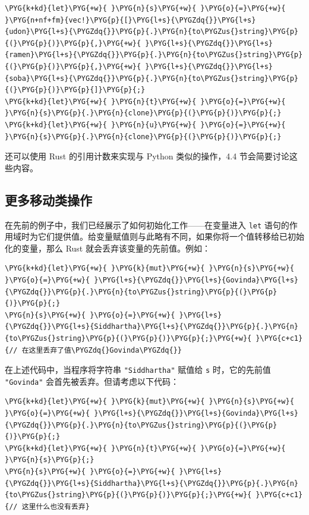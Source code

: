 \begin{Verbatim}[commandchars=\\\{\},breaklines=true,breakanywhere=true,fontsize=\codefont,xleftmargin=17bp]
\PYG{k+kd}{let}\PYG{+w}{ }\PYG{n}{s}\PYG{+w}{ }\PYG{o}{=}\PYG{+w}{ }\PYG{n+nf+fm}{vec!}\PYG{p}{[}\PYG{l+s}{\PYGZdq{}}\PYG{l+s}{udon}\PYG{l+s}{\PYGZdq{}}\PYG{p}{.}\PYG{n}{to\PYGZus{}string}\PYG{p}{(}\PYG{p}{)}\PYG{p}{,}\PYG{+w}{ }\PYG{l+s}{\PYGZdq{}}\PYG{l+s}{ramen}\PYG{l+s}{\PYGZdq{}}\PYG{p}{.}\PYG{n}{to\PYGZus{}string}\PYG{p}{(}\PYG{p}{)}\PYG{p}{,}\PYG{+w}{ }\PYG{l+s}{\PYGZdq{}}\PYG{l+s}{soba}\PYG{l+s}{\PYGZdq{}}\PYG{p}{.}\PYG{n}{to\PYGZus{}string}\PYG{p}{(}\PYG{p}{)}\PYG{p}{]}\PYG{p}{;}
\PYG{k+kd}{let}\PYG{+w}{ }\PYG{n}{t}\PYG{+w}{ }\PYG{o}{=}\PYG{+w}{ }\PYG{n}{s}\PYG{p}{.}\PYG{n}{clone}\PYG{p}{(}\PYG{p}{)}\PYG{p}{;}
\PYG{k+kd}{let}\PYG{+w}{ }\PYG{n}{u}\PYG{+w}{ }\PYG{o}{=}\PYG{+w}{ }\PYG{n}{s}\PYG{p}{.}\PYG{n}{clone}\PYG{p}{(}\PYG{p}{)}\PYG{p}{;}
\end{Verbatim}

还可以使用 Rust 的引用计数来实现与 Python 类似的操作，4.4 节会简要讨论这些内容。

\subsection{更多移动类操作}

在先前的例子中，我们已经展示了如何初始化工作——在变量进入 \texttt{let} 语句的作用域时为它们提供值。给变量赋值则与此略有不同，如果你将一个值转移给已初始化的变量，那么 Rust 就会丢弃该变量的先前值。例如：

\begin{Verbatim}[commandchars=\\\{\},breaklines=true,breakanywhere=true,fontsize=\codefont,xleftmargin=17bp]
\PYG{k+kd}{let}\PYG{+w}{ }\PYG{k}{mut}\PYG{+w}{ }\PYG{n}{s}\PYG{+w}{ }\PYG{o}{=}\PYG{+w}{ }\PYG{l+s}{\PYGZdq{}}\PYG{l+s}{Govinda}\PYG{l+s}{\PYGZdq{}}\PYG{p}{.}\PYG{n}{to\PYGZus{}string}\PYG{p}{(}\PYG{p}{)}\PYG{p}{;}
\PYG{n}{s}\PYG{+w}{ }\PYG{o}{=}\PYG{+w}{ }\PYG{l+s}{\PYGZdq{}}\PYG{l+s}{Siddhartha}\PYG{l+s}{\PYGZdq{}}\PYG{p}{.}\PYG{n}{to\PYGZus{}string}\PYG{p}{(}\PYG{p}{)}\PYG{p}{;}\PYG{+w}{ }\PYG{c+c1}{// 在这里丢弃了值\PYGZdq{}Govinda\PYGZdq{}}
\end{Verbatim}

在上述代码中，当程序将字符串 \texttt{"Siddhartha"} 赋值给 \texttt{s} 时，它的先前值 \texttt{"Govinda"} 会首先被丢弃。但请考虑以下代码：

\begin{Verbatim}[commandchars=\\\{\},breaklines=true,breakanywhere=true,fontsize=\codefont,xleftmargin=17bp]
\PYG{k+kd}{let}\PYG{+w}{ }\PYG{k}{mut}\PYG{+w}{ }\PYG{n}{s}\PYG{+w}{ }\PYG{o}{=}\PYG{+w}{ }\PYG{l+s}{\PYGZdq{}}\PYG{l+s}{Govinda}\PYG{l+s}{\PYGZdq{}}\PYG{p}{.}\PYG{n}{to\PYGZus{}string}\PYG{p}{(}\PYG{p}{)}\PYG{p}{;}
\PYG{k+kd}{let}\PYG{+w}{ }\PYG{n}{t}\PYG{+w}{ }\PYG{o}{=}\PYG{+w}{ }\PYG{n}{s}\PYG{p}{;}
\PYG{n}{s}\PYG{+w}{ }\PYG{o}{=}\PYG{+w}{ }\PYG{l+s}{\PYGZdq{}}\PYG{l+s}{Siddhartha}\PYG{l+s}{\PYGZdq{}}\PYG{p}{.}\PYG{n}{to\PYGZus{}string}\PYG{p}{(}\PYG{p}{)}\PYG{p}{;}\PYG{+w}{ }\PYG{c+c1}{// 这里什么也没有丢弃}
\end{Verbatim}

